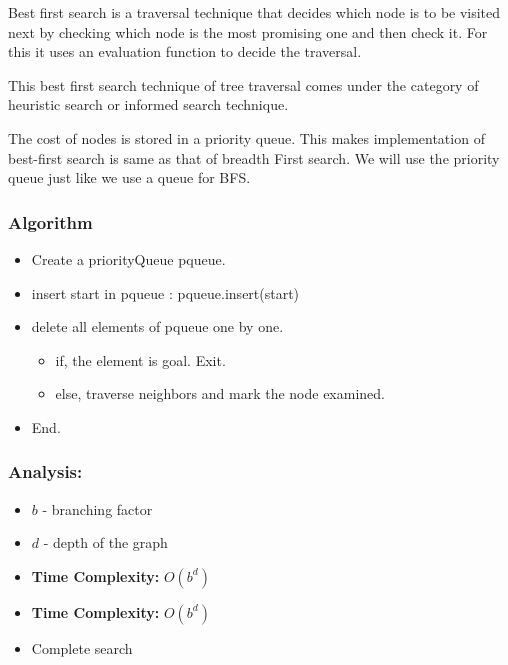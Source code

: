 Best first search is a traversal technique that decides which node is to be
visited next by checking which node is the most promising one and then check it.
For this it uses an evaluation function to decide the traversal.

This best first search technique of tree traversal comes under the category of
heuristic search or informed search technique.

The cost of nodes is stored in a priority queue. This makes implementation of
best-first search is same as that of breadth First search. We will use the
priority queue just like we use a queue for BFS.

\subsubsection*{Algorithm}

\begin{itemize}
    \item Create a priorityQueue pqueue.
    \item insert start in pqueue : pqueue.insert(start)
    \item delete all elements of pqueue one by one.
          \begin{itemize}
              \item if, the element is goal. Exit.
              \item else, traverse neighbors and mark the node examined.
          \end{itemize}
    \item End.
\end{itemize}

\subsubsection*{Analysis:}

\begin{itemize}
      \item $b$ - branching factor
      \item $d$ - depth of the graph
      \item \textbf{Time Complexity:} $O(b^d)$
      \item \textbf{Time Complexity:} $O(b^d)$
      \item Complete search
\end{itemize}